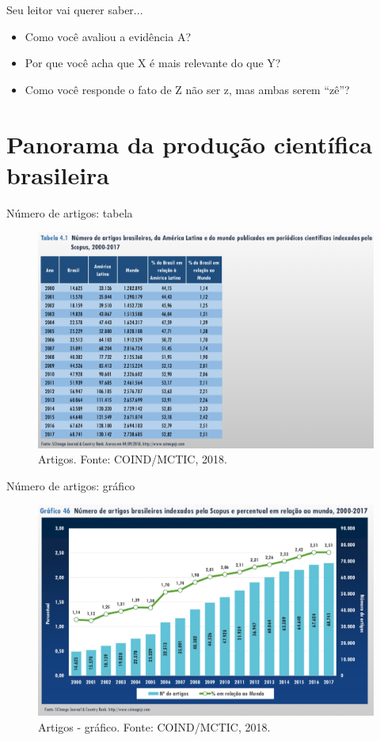 \begin{frame}{Seu leitor vai querer saber...}
\begin{itemize}
\item Como você avaliou a evidência A?
\item Por que você acha que X é mais relevante do que Y?
\item Como você responde o fato de Z não ser z, mas ambas serem ``zê''? 
\end{itemize}
\end{frame}

\section{Panorama da produção científica brasileira}

\begin{frame}{Número de artigos: tabela}
\begin{figure}
\centering
\includegraphics[scale=0.25]{figs/01/panorama-artigos-tabela}
\caption{Artigos. Fonte: COIND/MCTIC, 2018.}
\end{figure}
\end{frame}

\begin{frame}{Número de artigos: gráfico}
\begin{figure}
\centering
\includegraphics[scale=0.25]{figs/01/panorama-artigos}
\caption{Artigos - gráfico. Fonte: COIND/MCTIC, 2018.}
\end{figure}
\end{frame}

